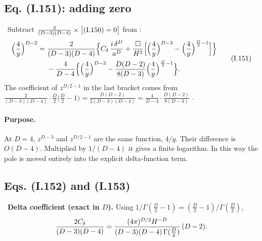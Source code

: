 \subsection{Eq. (I.151): adding zero}
\tD\ Subtract $\frac{2}{(D-3)(D-4)}\times\big[\text{(I.150)}=0\big]$ from :
\begin{equation}
\begin{aligned}
\Big(\frac4y\Big)^{D-2}={}&\frac{2}{(D-3)(D-4)}\Big\{C_{\delta}\,\frac{i\,\delta^D}{a^D}
+\frac{\square}{H^2}\Big[\Big(\frac4y\Big)^{D-3}-\Big(\frac4y\Big)^{\frac D2-1}\Big]\Big\}\\
&-\frac{4}{D-4}\Big\{\Big(\frac4y\Big)^{D-3}-\frac{D(D-2)}{8(D-3)}\Big(\frac4y\Big)^{\frac D2-1}\Big\}.
\end{aligned}
\tag{I.151}
\end{equation}
The coefficient of $z^{D/2-1}$ in the last bracket comes from
$\frac{2}{(D-3)(D-4)}\cdot\frac D2\big(\frac D2-1\big)=\frac{D(D-2)}{2(D-3)(D-4)}=\frac{4}{D-4}\cdot\frac{D(D-2)}{8(D-3)}$ \chEok.

\paragraph{Purpose.} At $D=4$, $z^{D-3}$ and $z^{D/2-1}$ are the same function, $4/y$. Their difference is $O(D-4)$.
Multiplied by $1/(D-4)$ it gives a finite logarithm. In this way the pole is moved entirely into the explicit delta-function term.

\subsection{Eqs. (I.152) and (I.153)}
\tD\ \textbf{Delta coefficient (exact in $D$).} Using $1/\Gamma(\tfrac D2-1)=(\tfrac D2-1)/\Gamma(\tfrac D2)$,
\begin{equation}
\frac{2C_{\delta}}{(D-3)(D-4)}=\frac{(4\pi)^{D/2}H^{-D}}{(D-3)(D-4)\,\Gamma(\frac D2)}\,(D-2) .
\label{eq:ch08-deltacoef}
\end{equation}

